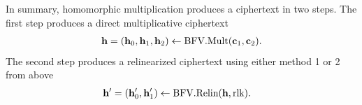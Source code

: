 \documentclass[../main.tex]{subfiles}
\begin{document}
In summary, homomorphic multiplication produces a ciphertext in two steps. The first step produces a direct multiplicative ciphertext 
\begin{align*}
    \mathbf{h} =(\mathbf{h}_0,\mathbf{h}_1,\mathbf{h}_2) \leftarrow \text{BFV}.\text{Mult}(\mathbf{c}_1,\mathbf{c}_2).
\end{align*}
The second step produces a relinearized ciphertext using either method 1 or 2 from above
\begin{align*}
    \mathbf{h}' &= (\mathbf{h}_0', \mathbf{h}_1') \leftarrow \text{BFV}.\text{Relin}(\mathbf{h}, \text{rlk}).
\end{align*}







%
%
\end{document}
